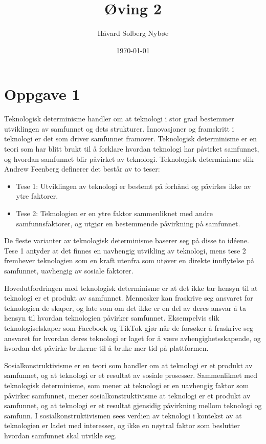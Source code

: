 \documentclass[a4paper, 12pt]{article}  %
\title{Øving 2}               %
\author{Håvard Solberg Nybøe}           %
\date{\today}                    %
\begin{document}
\maketitle

\section*{Oppgave 1}

Teknologisk determinisme handler om at teknologi i stor grad bestemmer utviklingen av samfunnet og dets strukturer. 
Innovasjoner og framskritt i teknologi er det som driver samfunnet framover. \parencite{balterzen08}
Teknologisk determinisme er en teori som har blitt brukt til å forklare hvordan teknologi har påvirket samfunnet, og hvordan samfunnet blir påvirket av teknologi.
Teknologisk determinisme slik Andrew Feenberg definerer det består av to teser:
\begin{itemize}
    \item Tese 1: Utviklingen av teknologi er bestemt på forhånd og påvirkes ikke av ytre faktorer.
    \item Tese 2: Teknologien er en ytre faktor sammenliknet med andre samfunnsfaktorer, og utgjør en bestemmende påvirkning på samfunnet.
\end{itemize}

De fleste varianter av teknologisk determinisme baserer seg på disse to idéene. Tese 1 antyder at det finnes en uavhengig utvikling av teknologi, mens tese 2 fremhever teknologien som en kraft utenfra som utøver en direkte innflytelse på samfunnet, uavhengig av sosiale faktorer. \parencite{balterzen08}

Hovedutfordringen med teknologisk determinisme er at det ikke tar hensyn til at teknologi er et produkt av samfunnet. 
Mennesker kan fraskrive seg ansvaret for teknologien de skaper, og late som om det ikke er en del av deres ansvar å ta hensyn til hvordan teknologien påvirker samfunnet.
Eksempelvis slik teknologiselskaper som Facebook og TikTok gjør når de forsøker å fraskrive seg ansvaret for hvordan deres teknologi er laget for å være avhengighetsskapende, og hvordan det påvirke brukerne til å bruke mer tid på plattformen.

Sosialkonstruktivisme er en teori som handler om at teknologi er et produkt av samfunnet, og at teknologi er et resultat av sosiale prosesser.
Sammenliknet med teknologisk determinisme, som mener at teknologi er en uavhengig faktor som påvirker samfunnet, mener sosialkonstruktivisme at teknologi er et produkt av samfunnet, og at teknologi er et resultat gjensidig påvirkning mellom teknologi og samfunn.\parencite{scot}
I sosialkonstruktivismen sees verdien av teknologi i kontekst av at teknologien er ladet med interesser, og ikke en nøytral faktor som beslutter hvordan samfunnet skal utvikle seg.
\end{document}
